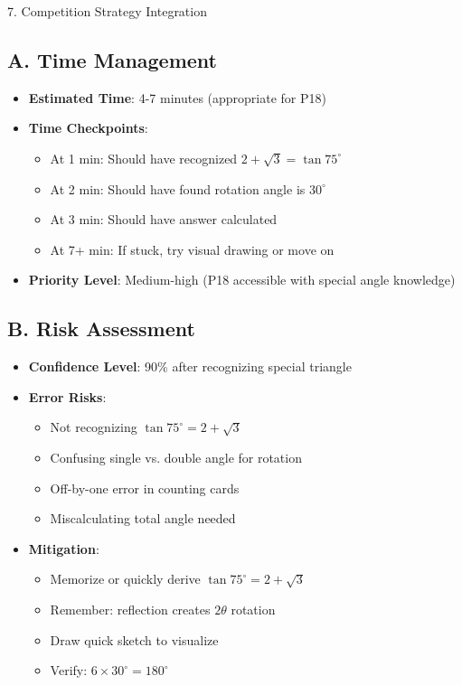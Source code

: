 \documentclass[12pt]{article}
\begin{document}
\begin{competitionbox}{7. Competition Strategy Integration}

\subsection*{A. Time Management}
\begin{itemize}[leftmargin=*]
    \item \textbf{Estimated Time}: 4-7 minutes (appropriate for P18)
    \item \textbf{Time Checkpoints}:
    \begin{itemize}
        \item At 1 min: Should have recognized $2+\sqrt{3} = \tan 75^\circ$
        \item At 2 min: Should have found rotation angle is $30^\circ$
        \item At 3 min: Should have answer calculated
        \item At 7+ min: If stuck, try visual drawing or move on
    \end{itemize}
    \item \textbf{Priority Level}: Medium-high (P18 accessible with special angle knowledge)
\end{itemize}

\subsection*{B. Risk Assessment}
\begin{itemize}[leftmargin=*]
    \item \textbf{Confidence Level}: 90\% after recognizing special triangle
    
    \item \textbf{Error Risks}: 
    \begin{itemize}
        \item Not recognizing $\tan 75^\circ = 2+\sqrt{3}$
        \item Confusing single vs. double angle for rotation
        \item Off-by-one error in counting cards
        \item Miscalculating total angle needed
    \end{itemize}
    
    \item \textbf{Mitigation}:
    \begin{itemize}
        \item Memorize or quickly derive $\tan 75^\circ = 2+\sqrt{3}$
        \item Remember: reflection creates $2\theta$ rotation
        \item Draw quick sketch to visualize
        \item Verify: $6 \times 30^\circ = 180^\circ$
    \end{itemize}
    

\end{itemize}
\end{competitionbox}
\end{document}
